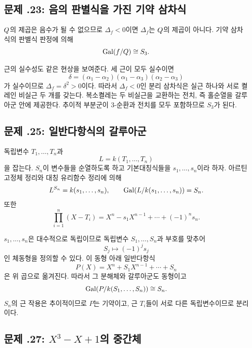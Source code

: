 \subsection*{문제 \thechapter.23: 음의 판별식을 가진 기약 삼차식}

\begin{solution}
$Q$의 제곱은 음수가 될 수 없으므로 $\Delta_f<0$이면 $\Delta_f$는 $Q$의 제곱이 아니다. 기약 삼차식의 판별식 판정에 의해
\[
  \operatorname{Gal}(f/Q)\cong S_3.
\]

근의 실수성도 같은 현상을 보여준다. 세 근이 모두 실수이면
\[
  \delta=(\alpha_1-\alpha_2)(\alpha_1-\alpha_3)(\alpha_2-\alpha_3)
\]
가 실수이므로 $\Delta_f=\delta^2>0$이다. 따라서 $\Delta_f<0$인 분리 삼차식은 실근 하나와 서로 켤레인 비실근 두 개를 갖는다. 복소켤레는 두 비실근을 교환하는 전치, 즉 홀순열을 갈루아군 안에 제공한다. 추이적 부분군이 $3$-순환과 전치를 모두 포함하므로 $S_3$가 된다.
\end{solution}

\subsection*{문제 \thechapter.25: 일반다항식의 갈루아군}

\begin{solution}
독립변수 $T_1,\dots,T_n$과
\[
  L=k(T_1,\dots,T_n)
\]
을 잡는다. $S_n$이 변수들을 순열하도록 하고 기본대칭식들을 $s_1,\dots,s_n$이라 하자. 아르틴 고정체 정리와 대칭 유리함수 정리에 의해
\[
  L^{S_n}=k(s_1,\dots,s_n),
  \qquad
  \operatorname{Gal}(L/k(s_1,\dots,s_n))=S_n.
\]
또한
\[
  \prod_{i=1}^n(X-T_i)
  =X^n-s_1X^{n-1}+\cdots+(-1)^ns_n.
\]

$s_1,\dots,s_n$은 대수적으로 독립이므로 독립변수 $S_1,\dots,S_n$과 부호를 맞추어
\[
  S_j\longmapsto(-1)^j s_j
\]
인 체동형을 정의할 수 있다. 이 동형 아래 일반다항식
\[
  P(X)=X^n+S_1X^{n-1}+\cdots+S_n
\]
은 위 곱으로 옮겨진다. 따라서 그 분해체와 갈루아군도 동형이고
\[
  \operatorname{Gal}(P/k(S_1,\dots,S_n))\cong S_n.
\]
$S_n$의 근 작용은 추이적이므로 $P$는 기약이고, 근 $T_i$들이 서로 다른 독립변수이므로 분리이다.
\end{solution}

\subsection*{문제 \thechapter.27: $X^3-X+1$의 중간체}

